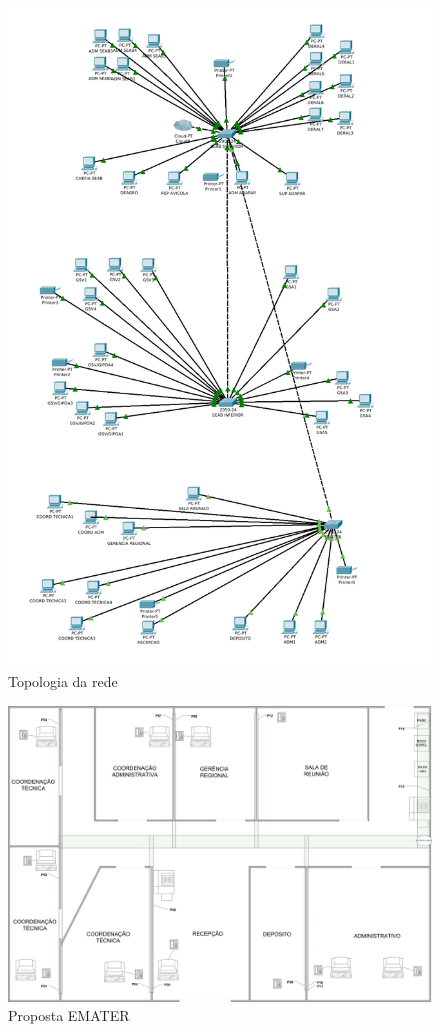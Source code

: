 \documentclass[	DIV=calc,%
							paper=a4,%
							fontsize=12pt,%
							onecolumn]{scrartcl}	 					%
\begin{document}
\begin{figure}[H]
	\centering
	\includegraphics[height=\textwidth,width=25cm,angle=0,keepaspectratio]{topologiarede}
	\caption{Topologia da rede}
	\label{TOPOLOGIA REDE}	
\end{figure}
\begin{figure}[H]
	\centering
	\includegraphics[height=\textwidth,width=25cm,angle=-90,keepaspectratio]{plantaematernova}
	\caption{Proposta EMATER}
	\label{PROPOSTA EMATER}	
\end{figure}
\end{document}
